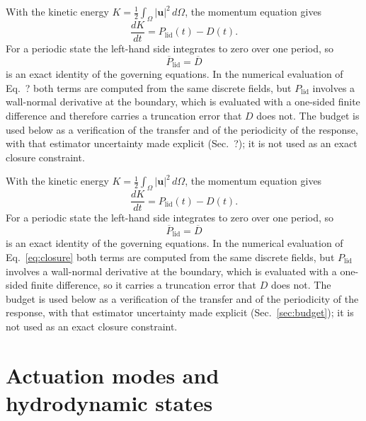 \documentclass[11pt,a4paper]{article}
\newcommand{\Dbar}{\overline{D}}
\newcommand{\Plid}{P_{\mathrm{lid}}}
\newenvironment{chgadd}{\par\color{blue}}{\par\color{black}}
\newenvironment{chgdel}{\par\color{red}}{\par\color{black}}
\begin{document}
\begin{chgdel}
With the kinetic energy $K=\tfrac12\int_\Omega|\mathbf{u}|^2\,d\Omega$, the
momentum equation gives
\begin{equation}
\frac{dK}{dt}=\Plid(t)-D(t).
\end{equation}
For a periodic state the left-hand side integrates to zero over one period, so
\begin{equation}
\boxed{\ \overline{P}_{\mathrm{lid}}=\Dbar\ }
\end{equation}
is an exact identity of the governing equations. In the numerical evaluation of
Eq.~? both terms are computed from the same discrete fields, but
$\Plid$ involves a wall-normal derivative at the boundary, which is evaluated with
a one-sided finite difference and therefore carries a truncation error that $D$
does not. The budget is used below as a verification of the transfer and of the
periodicity of the response, with that estimator uncertainty made explicit
(Sec.~?); it is not used as an exact closure constraint.
\end{chgdel}

\begin{chgadd}
With the kinetic energy $K=\tfrac12\int_\Omega|\mathbf{u}|^2\,d\Omega$, the
momentum equation gives
\begin{equation}
\frac{dK}{dt}=\Plid(t)-D(t).
\label{eq:budget}
\end{equation}
For a periodic state the left-hand side integrates to zero over one period, so
\begin{equation}
\boxed{\ \overline{P}_{\mathrm{lid}}=\Dbar\ }
\label{eq:closure}
\end{equation}
is an exact identity of the governing equations. In the numerical evaluation of
Eq.~\eqref{eq:closure} both terms are computed from the same discrete fields, but
$\Plid$ involves a wall-normal derivative at the boundary, which is evaluated with
a one-sided finite difference, so it carries a truncation error that $D$
does not. The budget is used below as a verification of the transfer and of the
periodicity of the response, with that estimator uncertainty made explicit
(Sec.~\ref{sec:budget}); it is not used as an exact closure constraint.
\end{chgadd}

\section{Actuation modes and hydrodynamic states}
\label{sec:modes}
\end{document}
